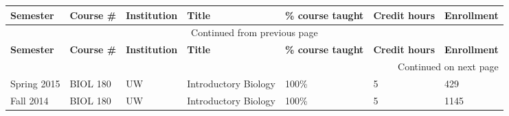 {\sffamily\small
{}
\begin{longtable}[l]{ p{0.7in} p{0.7in} p{0.7in} p{1.5in} p{0.7in} p{0.4in} p{0.8in} }
    \hline
    \textbf{Semester} & \textbf{Course \#} & \textbf{Institution} & \textbf{Title} & \textbf{\% course taught} & \textbf{Credit hours} & \textbf{Enrollment} \\
    \hline
    \endfirsthead
    \multicolumn{7}{c}{{Continued from previous page}} \\
    \hline
    \textbf{Semester} & \textbf{Course \#} & \textbf{Institution} & \textbf{Title} & \textbf{\% course taught} & \textbf{Credit hours} & \textbf{Enrollment} \\
    \hline
    \endhead
    \hline \multicolumn{7}{|r|}{{Continued on next page}} \\
    \endfoot
    \hline
    \endlastfoot
    Spring 2015 & BIOL 180 & UW & Introductory Biology & 100\% & 5 & 429 \\
    Fall 2014 & BIOL 180 & UW & Introductory Biology & 100\% & 5 & 1145 \\
\end{longtable}
}
